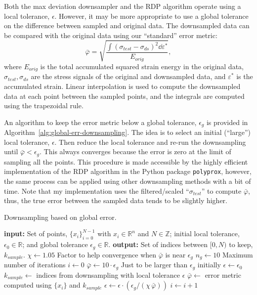\documentclass[a4paper,11pt]{article}
\begin{document}
Both the max deviation downsampler and the RDP algorithm operate using a local tolerance, $\epsilon$.
However, it may be more appropriate to use a global tolerance on the difference between sampled and original data.
The downsampled data can be compared with the original data using our ``standard'' error metric:
\begin{equation}
    \bar{\varphi} = \sqrt{\frac{\int (\sigma_{test} - \sigma_{ds})^2 \dd \varepsilon^*}{E_{orig}}},
\end{equation}
where $E_{orig}$ is the total accumulated squared strain energy in the original data, $\sigma_{test}, \sigma_{ds}$ are the stress signals of the original and downsampled data, and $\varepsilon^*$ is the accumulated strain.
Linear interpolation is used to compute the downsampled data at each point between the sampled points, and the integrals are computed using the trapezoidal rule.

An algorithm to keep the error metric below a global tolerance, $\epsilon_g$ is provided in Algorithm~\ref{alg:global-err-downsampling}.
The idea is to select an initial (``large'') local tolerance, $\epsilon$.
Then reduce the local tolerance and re-run the downsampling until $\bar{\varphi} < \epsilon_{g}$.
This always converges because the error is zero at the limit of sampling all the points.
This procedure is made accessible by the highly efficient implementation of the RDP algorithm in the Python package \texttt{polyprox}, however, the same process can be applied using other downsampling methods with a bit of time.
Note that my implementation uses the filtered/scaled ``$\sigma_{test}$'' to compute $\bar{\varphi}$, thus, the true error between the sampled data tends to be slightly higher.

\begin{algorithm}
	\caption{Downsampling based on global error.}
	\label{alg:global-err-downsampling}
	\begin{algorithmic}[1]
		\State \textbf{input:} Set of points, $\{x_i\}_{i=0}^{N-1}$ with $x_i \in \mathbb{R}^n$ and $N \in \mathbb{Z}$; initial local tolerance, $\epsilon_0 \in \mathbb{R}$; and
        global tolerance $\epsilon_g \in \mathbb{R}$.
        \State \textbf{output:} Set of indices between $[0, N)$ to keep, $k_{sample}$.
        \State $\chi \gets 1.05$
        \Comment Factor to help convergence when $\bar{\varphi}$ is near $\epsilon_g$
        \State $n_g \gets 10$
        \Comment Maximum number of iterations
        \State $i \gets 0$
        \State $\bar{\varphi} \gets 10 \cdot \epsilon_g$
        \Comment Just to be larger than $\epsilon_g$ initially
        \State $\epsilon \gets \epsilon_0$
            \State $k_{sample} \gets$ indices from downsampling with local tolerance $\epsilon$
            \State $\bar{\varphi} \gets$ error metric computed using $\{x_i\}$ and $k_{sample}$
                \State $\epsilon \gets \epsilon \cdot (\epsilon_g / (\chi \, \bar{\varphi}))$
                \State $i \gets i + 1$
            \EndIf
		\EndWhile
\end{algorithmic}
\end{algorithm}
\end{document}
